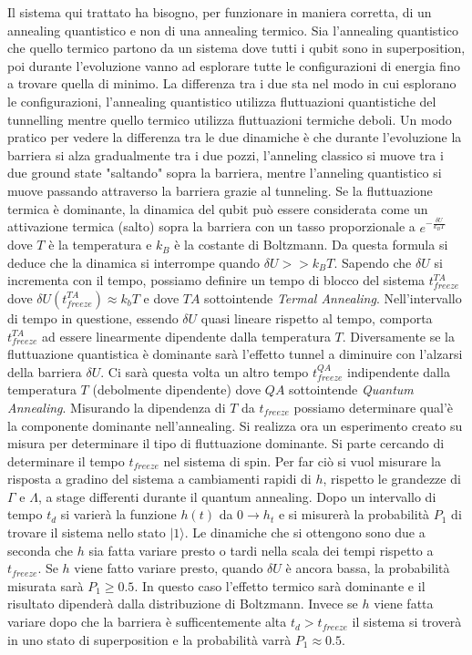 \cite{QAS}Il sistema qui trattato ha bisogno, per funzionare in maniera corretta, di un annealing quantistico e non di una annealing termico.
Sia l'annealing quantistico che quello termico partono da un sistema dove tutti i qubit sono in superposition, poi durante l'evoluzione vanno ad esplorare tutte le configurazioni di energia fino a trovare quella di minimo. La differenza tra i due sta nel modo in cui esplorano le configurazioni, l'annealing quantistico utilizza fluttuazioni quantistiche del tunnelling mentre quello termico utilizza fluttuazioni termiche deboli. Un modo pratico per vedere la differenza tra le due dinamiche è che durante l'evoluzione la barriera si alza gradualmente tra i due pozzi, l'anneling classico si muove tra i due ground state "saltando" sopra la barriera, mentre l'anneling quantistico si muove passando attraverso la barriera grazie al tunneling.
Se la fluttuazione termica è dominante, la dinamica del qubit può essere considerata come un attivazione termica (salto) sopra la barriera con un tasso proporzionale a $e^{-\frac{\delta U}{k_B T}}$ dove $T$ è la temperatura e $k_B$ è la costante di Boltzmann. Da questa formula si deduce che la dinamica si interrompe quando $\delta U >> k_B T$. Sapendo che $\delta U$ si incrementa con il tempo, possiamo definire un tempo di blocco del sistema $t_{freeze}^{TA}$ dove $\delta U(t_{freeze}^{TA}) \approx k_bT$ e dove $TA$ sottointende \textit{Termal Annealing}. Nell'intervallo di tempo in questione, essendo $\delta U$ quasi lineare rispetto al tempo, comporta $t_{freeze}^{TA}$ ad essere linearmente dipendente dalla temperatura $T$.
Diversamente se la fluttuazione quantistica è dominante sarà l'effetto tunnel a diminuire con l'alzarsi della barriera $\delta U$. Ci sarà questa volta un altro tempo $t_{freeze}^{QA}$ indipendente dalla temperatura $T$ (debolmente dipendente) dove $QA$ sottointende \textit{Quantum Annealing}. Misurando la dipendenza di $T$ da $t_{freeze}$ possiamo determinare qual'è la componente dominante nell'annealing.
Si realizza ora un esperimento creato su misura per determinare il tipo di fluttuazione dominante. Si parte cercando di determinare il tempo $t_{freeze}$ nel sistema di spin. Per far ciò si vuol misurare la risposta a gradino del sistema a cambiamenti rapidi di $h$, rispetto le grandezze di $\Gamma$ e $\Lambda$, a stage differenti durante il quantum annealing. Dopo un intervallo di tempo $t_d$ si varierà la funzione $h(t)$ da $0 \to h_t$ e si misurerà la probabilità $P_1$ di trovare il sistema nello stato $|1\rangle$. Le dinamiche che si ottengono sono due a seconda che $h$ sia fatta variare presto o tardi nella scala dei tempi rispetto a $t_{freeze}$. Se $h$ viene fatto variare presto, quando $\delta U$ è ancora bassa, la probabilità misurata sarà $P_1 \ge 0.5$. In questo caso l'effetto termico sarà dominante e il risultato dipenderà dalla distribuzione di Boltzmann. Invece se $h$ viene fatta variare dopo che la barriera è sufficentemente alta $t_d > t_{freeze}$ il sistema si troverà in uno stato di superposition e la probabilità varrà $P_1 \approx 0.5$.

